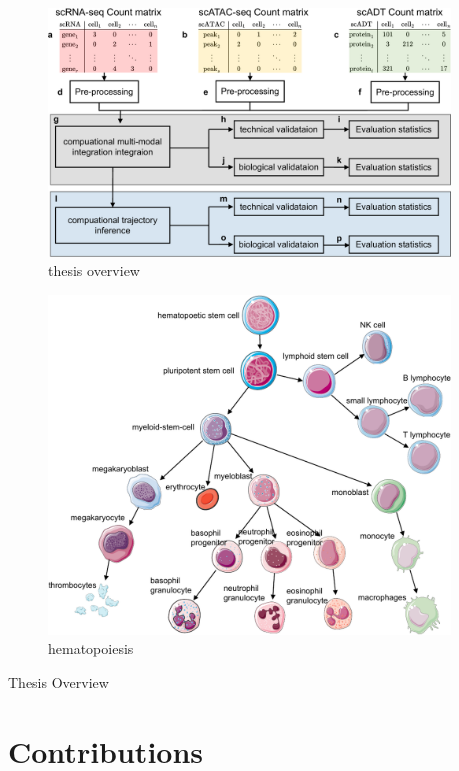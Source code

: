 \begin{figure}[!ht]
	\centering
	\includegraphics[width=0.95\textwidth]{thesis_overview/fig}
	\vspace{0.1cm}
	\caption[thesis overview]{thesis overview}
	\label{fig:thesis_overview}
\end{figure}

\begin{figure}[!ht]
	\centering
	\includegraphics[width=0.95\textwidth]{blood/fig}
	\vspace{0.1cm}
	\caption[hematopoiesis cells differentiation tree]{hematopoiesis}
	\label{fig:hematopoiesis}
\end{figure}




Thesis Overview
\section{Contributions}
\label{introduction:sec3.contributions}

